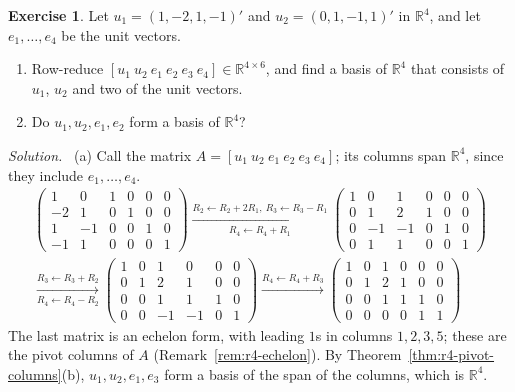 \documentclass[12pt]{article}
\newcommand{\R}{\mathbb R}
\theoremstyle{definition}
\newtheorem{exercise}{Exercise}
\newenvironment{solution}{\par\noindent\textit{Solution.}\ }{\par\smallskip}
\begin{document}
\begin{exercise}\label{ex:r4-extend-drill}
Let \(u_1=(1,-2,1,-1)'\) and \(u_2=(0,1,-1,1)'\) in \(\R^4\), and let \(e_1,\dots,e_4\) be the
unit vectors.
\begin{enumerate}
\item Row-reduce \([u_1\ u_2\ e_1\ e_2\ e_3\ e_4]\in\R^{4\times6}\), and find a basis of \(\R^4\) that
consists of \(u_1\), \(u_2\) and two of the unit vectors.
\item Do \(u_1,u_2,e_1,e_2\) form a basis of \(\R^4\)?
\end{enumerate}
\end{exercise}
\begin{solution}
(a) Call the matrix \(A=[u_1\ u_2\ e_1\ e_2\ e_3\ e_4]\); its columns span \(\R^4\), since they
include \(e_1,\dots,e_4\).
\[
\begin{gathered}
\left(\begin{array}{cc|cccc}1&0&1&0&0&0\\-2&1&0&1&0&0\\1&-1&0&0&1&0\\-1&1&0&0&0&1\end{array}\right)
\xrightarrow[R_4\leftarrow R_4+R_1]{R_2\leftarrow R_2+2R_1,\ R_3\leftarrow R_3-R_1}
\left(\begin{array}{cc|cccc}1&0&1&0&0&0\\0&1&2&1&0&0\\0&-1&-1&0&1&0\\0&1&1&0&0&1\end{array}\right)
\\
\xrightarrow[R_4\leftarrow R_4-R_2]{R_3\leftarrow R_3+R_2}
\left(\begin{array}{cc|cccc}1&0&1&0&0&0\\0&1&2&1&0&0\\0&0&1&1&1&0\\0&0&-1&-1&0&1\end{array}\right)
\xrightarrow{R_4\leftarrow R_4+R_3}
\left(\begin{array}{cc|cccc}1&0&1&0&0&0\\0&1&2&1&0&0\\0&0&1&1&1&0\\0&0&0&0&1&1\end{array}\right)
\end{gathered}
\]
The last matrix is an echelon form, with leading \(1\)s in columns \(1,2,3,5\); these are the pivot
columns of \(A\) (Remark~\ref{rem:r4-echelon}). By Theorem~\ref{thm:r4-pivot-columns}(b),
\(u_1,u_2,e_1,e_3\) form a basis of the span of the columns, which is \(\R^4\).


\end{solution}
\end{document}
